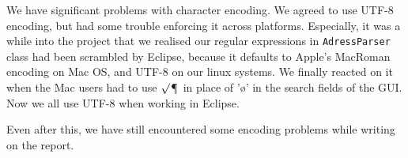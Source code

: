 
We have significant problems with character encoding. We agreed to use UTF-8 encoding, but had some trouble enforcing it across platforms. Especially, it was a while into the project that we realised our regular expressions in \texttt{AdressParser} class had been scrambled by Eclipse, because it defaults to Apple's MacRoman encoding on Mac OS, and UTF-8 on our linux systems. 
We finally reacted on it when the Mac users had to use $\surd$\P\ in place of '\o' in the search fields of the GUI. Now we all use UTF-8 when working in Eclipse. 

Even after this, we have still encountered some encoding problems while writing on the report.
